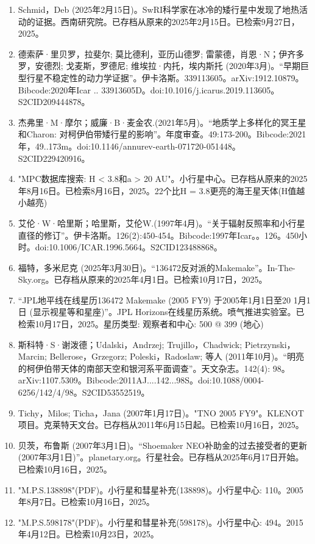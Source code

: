 \begin{enumerate}
\item Schmid，Deb (2025年2月15日)。SwRI科学家在冰冷的矮行星中发现了地热活动的证据。西南研究院。已存档从原来的2025年2月15日。已检索9月27日，2025。
\item 德索萨·里贝罗，拉斐尔; 莫比德利，亚历山德罗; 雷蒙德，肖恩·N；伊齐多罗，安德烈; 戈麦斯，罗德尼; 维埃拉·内托，埃内斯托 (2020年3月)。“早期巨型行星不稳定性的动力学证据”。伊卡洛斯。339113605。arXiv:1912.10879。Bibcode:2020年Icar .. 33913605D。doi:10.1016/j.icarus.2019.113605。S2CID209444878。 
\item 杰弗里·M·摩尔；威廉·B·麦金农.(2021年5月)。“地质学上多样化的冥王星和Charon: 对柯伊伯带矮行星的影响”。年度审查。49:173-200。Bibcode:2021年，49..173m。doi:10.1146/annurev-earth-071720-051448。S2CID229420916。 
\item "MPC数据库搜索: H < 3.8和a > 20 AU"。小行星中心。已存档从原来的2025年8月16日。已检索8月16日，2025。22个比H = 3.8更亮的海王星天体(H值越小越亮)
\item 艾伦·W·哈里斯；哈里斯，艾伦W.(1997年4月)。“关于辐射反照率和小行星直径的修订”。伊卡洛斯。126(2):450-454。Bibcode:1997年Icar。。126。450小时。doi:10.1006/ICAR.1996.5664。S2CID123488868。 
\item 福特，多米尼克 (2025年3月30日)。“136472反对派的Makemake”。In-The-Sky.org。已存档从原来的2025年4月1日。已检索10月17日，2025。
\item “JPL地平线在线星历136472 Makemake (2005 FY9) 于2005年1月1日至20 1月1日 (显示视星等和星座)”。JPL Horizons在线星历系统。喷气推进实验室。已检索10月17日，2025。星历类型: 观察者和中心: 500 @ 399 (地心)
\item 斯科特·S·谢泼德；Udalski，Andrzej; Trujillo，Chadwick; Pietrzynski，Marcin; Bellerose，Grzegorz; Poleski，Radoslaw; 等人 (2011年10月)。“明亮的柯伊伯带天体的南部天空和银河系平面调查”。天文杂志。142(4): 98。arXiv:1107.5309。Bibcode:2011AJ....142...98S。doi:10.1088/0004-6256/142/4/98。S2CID53552519。 
\item Tichy，Milos; Ticha，Jana (2007年1月17日)。"TNO 2005 FY9"。KLENOT项目。克莱特天文台。已存档从2011年6月15日起。已检索10月16日，2025。
\item 贝茨，布鲁斯 (2007年3月1日)。“Shoemaker NEO补助金的过去接受者的更新 (2007年3月1日)”。planetary.org。行星社会。已存档从2025年6月17日开始。已检索10月16日，2025。
\item "M.P.S.138898"(PDF)。小行星和彗星补充(138898)。小行星中心: 110。2005年8月7日。已检索10月16日，2025。
\item "M.P.S.598178"(PDF)。小行星和彗星补充(598178)。小行星中心: 494。2015年4月12日。已检索10月23日，2025。

\end{enumerate}
